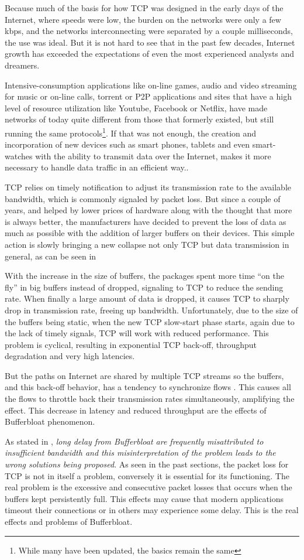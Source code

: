 Because much of the basis for how TCP was designed in the early days of the
Internet, where speeds were low, the burden on the networks were only a few
kbps, and the networks interconnecting were separated by a couple
milliseconds, the use was ideal. But it is not hard to see that in the past
few decades, Internet growth has exceeded the expectations of even the most
experienced analysts and dreamers.

Intensive-consumption applications like on-line games, audio and video
streaming for music or on-line calls, torrent or P2P applications and 
sites that have a high level of resource utilization like Youtube, Facebook or
Netflix, have made networks of today quite different from those that formerly
existed, but still running the same protocols\footnote{While many have been
updated, the basics remain the same}. If that was not enough, the creation and
incorporation of new devices such as smart phones, tablets and even smart-watches
with the ability to transmit data over the Internet, makes it more necessary to handle data traffic in an efficient way..

TCP relies on timely notification to adjust its transmission rate to the
available bandwidth, which is commonly signaled by packet loss. But since a
couple of years, and helped by lower prices of hardware along
with the thought that more is always better, the manufacturers have decided to
prevent the loss of data as much as possible with the addition of larger buffers on
their devices. This simple action is slowly bringing a new collapse not only
TCP but data transmission in general, as can be seen in \cite{CACMStaff}

With the increase in the size of buffers, the packages spent more time
``on the fly'' in big buffers instead of dropped, signaling to TCP to
reduce the sending rate. When finally a large amount of data is dropped,
it causes TCP to
sharply drop in transmission rate, freeing up bandwidth. Unfortunately, due to
the size of the buffers being static, when the new TCP slow-start phase starts,
again due to the lack of timely signals, TCP will work with reduced
performance. This problem is cyclical, resulting in exponential TCP back-off,
throughput degradation and very high latencies.

But the paths on Internet are shared by multiple TCP streams so the buffers,
and this back-off behavior, has a tendency to synchronize flows
\cite{main:ref:1}. This causes all the flows to throttle back their
transmission rates simultaneously, amplifying the effect. This decrease in
latency and reduced throughput are the effects of Bufferbloat phenomenon.

As stated in \cite{GettysNichols}, \emph{long delay from Bufferbloat are
frequently misattributed to insufficient bandwidth and this misinterpretation
of the problem leads to the wrong solutions being proposed}. As seen in the
past sections, the packet loss for TCP is not in itself a problem, conversely
it is essential for its functioning. The real problem is  the excessive and
consecutive packet losses that occurs when the buffers kept persistently
full. This effects may cause that modern applications timeout their
connections or in others may experience some delay. This is the real
effects and problems of Bufferbloat.
